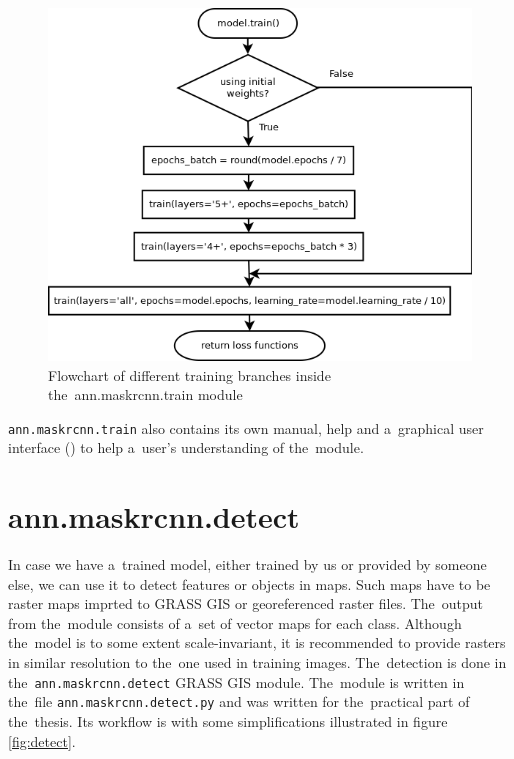 \begin{figure}[H]
   \centering
	\includegraphics[width=\linewidth]{./pictures/training_dia.png}
	\caption[ann.maskrcnn.train training flowchart]{Flowchart of different training branches inside the~ann.maskrcnn.train module}
      \label{fig:training}
\end{figure}

\verb|ann.maskrcnn.train| also contains its own manual, help and a~graphical 
user interface () to help a~user's understanding of the~module.

\section{ann.maskrcnn.detect}
\label{detect-module}

In case we have a~trained model, either trained by us or provided by someone 
else, we can use it to detect features or objects in maps. Such maps have to be 
raster maps imprted to GRASS GIS or georeferenced raster files. The~output
from the~module consists of a~set of vector 
maps for each class. Although the~model is to some extent scale-invariant, it is 
recommended to provide rasters in similar resolution to the~one used in
training images. The~detection is done in the~\verb|ann.maskrcnn.detect| GRASS GIS
module. The~module is written in the~file \verb|ann.maskrcnn.detect.py| and was 
written for the~practical part of the~thesis. Its workflow is with some 
simplifications illustrated in figure \ref{fig:detect}.

